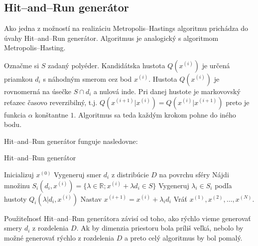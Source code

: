 \subsection{Hit--and--Run generátor}

Ako jedna z možností na realizáciu Metropolis--Hastings algoritmu prichádza do úvahy Hit--and--Run generátor. Algoritmus je analogický s algoritmom Metropolis--Hasting.

Označme si $S$ zadaný polyéder. Kandidátska hustota $Q(x^{(i)})$ je určená priamkou $d_i$ s náhodným smerom cez bod $x^{(i)}$. Hustota $Q(x^{(i)})$ je rovnomerná na úsečke $S \cap d_i$ a nulová inde. Pri danej hustote je markovovský reťazec časovo reverzibilný, t.j. $Q(x^{(i+1)}|x^{(i)})=Q(x^{(i)}|x^{(i+1)})$ \cite{hit-and-run_chen} preto je funkcia $\alpha$ konštantne $1$. Algoritmus sa teda každým krokom pohne do iného bodu.

Hit--and--Run generátor funguje nasledovne:

\begin{algorithm}[H]
	\caption{Hit--and--Run generátor \cite{hit-and-run_chen}}
	\label{hit--and--run}
	\begin{algorithmic}[1]
		\State Inicializuj $x^{(0)}$
			\State Vygeneruj smer $d_i$ z distribúcie $D$ na povrchu sféry
			\State Nájdi množinu $S_i(d_i,x^{(i)})=\{\lambda \in \mathbb{R}; x^{(i)} + \lambda d_i \in S \} $
			\State Vygeneruj $\lambda_i \in S_i$ podľa hustoty $Q_i(\lambda | d_i, x^{(i)})$
			\State Nastav $x^{(i+1)}=x^{(i)}+\lambda_i d_i$
		\EndFor
		\State Vráť $x^{(1)},x^{(2)},\dots,x^{(N)}$.
	\end{algorithmic}
\end{algorithm}

Použiteľnosť Hit--and--Run generátora závisí od toho, ako rýchlo vieme generovať smery $d_i$ z rozdelenia $D$. Ak by dimenzia priestoru bola príliš veľká, nebolo by možné generovať rýchlo z rozdelenia $D$ a preto celý algoritmus by bol pomalý.



